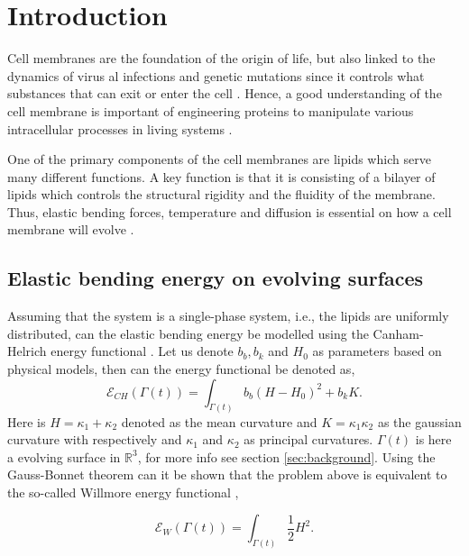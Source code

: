 \section{Introduction}\label{sec:introduction}

Cell membranes are the foundation of the origin of life, but also linked to the dynamics of virus al infections and genetic mutations since it controls what substances that can exit or enter the cell \cite{ hurley2010membrane}. Hence, a good
understanding of the cell membrane is important of engineering proteins to manipulate various intracellular processes in living systems \cite{rojas1998genetic}.

One of the primary components of the cell membranes are lipids which serve many different functions. A key function is that it is consisting of a bilayer of lipids which controls the structural rigidity and the fluidity of the membrane. Thus, elastic
bending forces, temperature and diffusion is essential on how a cell membrane will evolve \cite{udo97,neidleman87}.


\subsection{Elastic bending energy on evolving surfaces}%
\label{sub:willmore_flow}

Assuming that the system is a single-phase system, i.e., the lipids are uniformly distributed, can the elastic bending energy be modelled using the Canham-Helrich energy functional \cite{helfrich1973elastic, wang08, udo97}. Let us denote $b_{b},
b_{k}$ and $H_{0}$ as parameters based on physical models, then can the energy functional be denoted as,
\begin{equation}
\label{eq:CH}
\mathcal{E} _{CH}\left( \Gamma\left( t \right)   \right) =   \int_{\Gamma\left( t \right)  }^{}  b_{b} \left( H- H_{0} \right) ^{2} + b_{k} K
.\end{equation}
Here is $H =  \kappa_1 + \kappa_2 $ denoted as the mean curvature and $K = \kappa_1 \kappa_2$ as the gaussian curvature with respectively and $\kappa_1$ and $\kappa_2$ as principal curvatures. $\Gamma \left( t
\right) $ is here a evolving surface in $\mathbb{R} ^3$, for more info see section \ref{sec:background}.  Using the Gauss-Bonnet theorem can it be shown that the problem above is equivalent to the so-called Willmore energy
functional \cite{montiel2009curves, willmore1996riemannian},

\begin{equation}
\label{eq:WE}
\mathcal{E} _{W} \left( \Gamma\left( t \right)   \right) = \int_{\Gamma\left( t \right)  }^{} \frac{1}{2} H ^2
.\end{equation}

